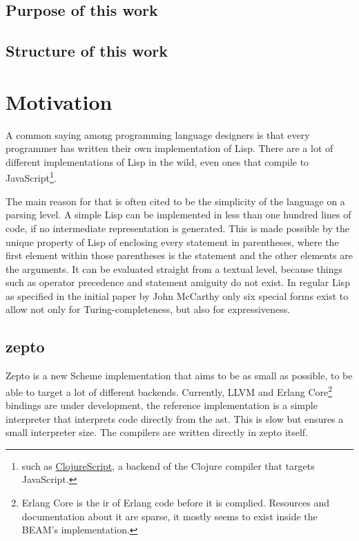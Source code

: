 \documentclass[oneside,11pt,xetex]{scrbook}
\begin{document}
\begin{onehalfspace}
\section{Purpose of this work}

\section{Structure of this work}

\chapter{Motivation}
\label{chap:Motivation}

A common saying among programming language designers is that every programmer has written
their own implementation of Lisp. There are a lot of different implementations of Lisp
in the wild, even ones that compile to JavaScript\footnote{such as \href{https://github.com/clojure/clojurescript}{ClojureScript},
a backend of the Clojure compiler that targets JavaScript.}.

The main reason for that is often cited to be the simplicity of the language on a parsing
level. A simple Lisp can be implemented in less than one hundred lines of code, if no
intermediate representation is generated. This is made possible by the unique property
of Lisp of enclosing every statement in parentheses, where the first element within
those parentheses is the statement and the other elements are the arguments.
It can be evaluated straight from a textual level, because things such as operator precedence
and statement amiguity do not exist. In regular Lisp as specified in the initial paper by
John McCarthy\parencite{GCM} only six special forms exist to allow not only for Turing-completeness,
but also for expressiveness.

\section{zepto}

Zepto is a new Scheme implementation that aims to be as small as possible, to be able
to target a lot of different backends. Currently, LLVM and Erlang Core\footnote{Erlang Core 
is the \gls{ir} of Erlang code before it is complied. Resources and documentation
about it are sparse, it mostly seems to exist inside the BEAM's implementation.} bindings are
under development, the reference implementation is a simple interpreter that interprets code
directly from the \gls{ast}. This is slow but ensures a small interpreter size. The compilers are written directly in
zepto itself.


\end{onehalfspace}
\end{document}
